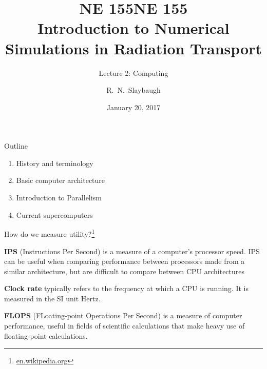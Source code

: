\documentclass[xcolor=x11names,compress]{beamer}
\title{NE 155}
\author{R.\ N.\ Slaybaugh}
\date{January 20, 2017}
\renewcommand{\(}{\begin{columns}}
\renewcommand{\)}{\end{columns}}
\newcommand{\<}[1]{\begin{column}{#1}}
\renewcommand{\>}{\end{column}}
\begin{document}
\begin{frame}
\title{NE 155\\Introduction to Numerical Simulations in Radiation Transport}
\subtitle{Lecture 2: Computing}
\titlepage
\end{frame}

\begin{frame}{Outline}
\begin{enumerate}
\item History and terminology
\vspace*{1 em}
\item Basic computer architecture
\vspace*{1 em}
\item Introduction to Parallelism
\vspace*{1 em}
\item Current supercomputers
\end{enumerate}
\end{frame}

\begin{frame}{How do we measure utility?\footnote{\href{en.wikipedia.org}{en.wikipedia.org}}}

\textbf{IPS} (Instructions Per Second) is a measure of a computer's processor speed. IPS can be useful when comparing performance between processors made from a similar architecture, but are difficult to compare between CPU architectures

\vspace*{1 em}
\textbf{Clock rate} typically refers to the frequency at which a CPU is running. It is measured in the SI unit Hertz.

\vspace*{1 em}
\textbf{FLOPS} (FLoating-point Operations Per Second) is a measure of computer performance, useful in fields of scientific calculations that make heavy use of floating-point calculations. 
\end{frame}
\end{document}
